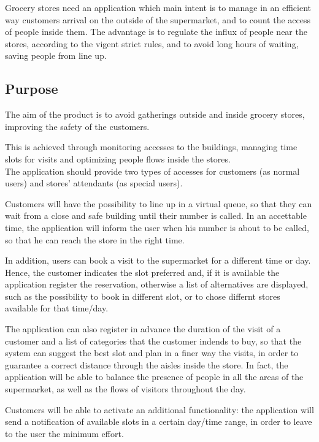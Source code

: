 \documentclass[12pt]{article}
\begin{document}
Grocery stores need an application which main intent is to manage in an efficient way customers arrival on the outside of the supermarket, and to count the access of people inside them. The advantage is to regulate the influx of people near the stores, according to the vigent strict rules, and to avoid long hours of waiting, saving people from line up.

\subsection{Purpose}
The aim of the product is to avoid gatherings outside and inside grocery stores,  improving the safety of the customers.

This is achieved through monitoring accesses to the buildings, managing time slots for visits and optimizing people flows inside the stores.\\

The application should provide two types of accesses for customers (as normal users) and stores' attendants (as special users).

Customers will have the possibility to line up in a virtual queue, so that they can wait from a close and safe building until their number is called. In an accettable time, the application will inform the user when his number is about to be called, so that he can reach the store in the right time.

In addition, users can book a visit to the supermarket for a different time or day. Hence, the customer indicates the slot preferred and, if it is available the application register the reservation, otherwise a list of alternatives are displayed, such as the possibility to book in different slot, or to chose differnt stores available for that time/day.

The application can also register in advance the duration of the visit of a customer and a list of categories that the customer indends to buy, so that the system can suggest the best slot and plan in a finer way the visits, in order to guarantee a correct distance through the aisles inside the store. In fact, the application will be able to balance the presence of people in all the areas of the supermarket, as well as the flows of visitors throughout the day.

Customers will be able to activate an additional functionality: the application will send a notification of available slots in a certain day/time range, in order to leave to the user the minimum effort.
\end{document}
